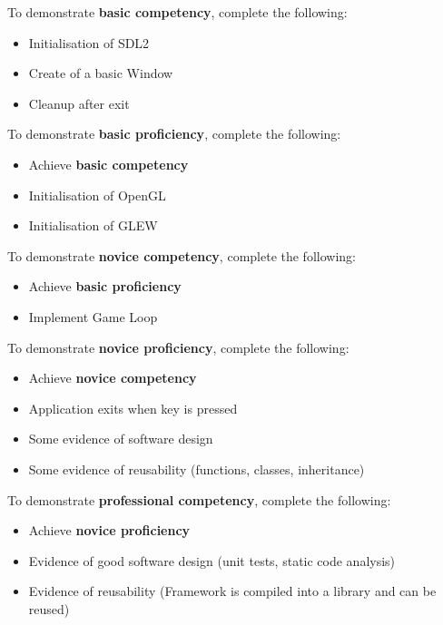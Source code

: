 \documentclass{../../../fal_assignment}
\begin{document}
To demonstrate \textbf{basic competency}, complete the following:
\begin{itemize}
	\item Initialisation of SDL2
	\item Create of a basic Window
	\item Cleanup after exit
\end{itemize} 

To demonstrate \textbf{basic proficiency}, complete the following:
\begin{itemize}
	\item Achieve \textbf{basic competency}
	\item Initialisation of OpenGL
	\item Initialisation of GLEW
\end{itemize}

To demonstrate \textbf{novice competency}, complete the following:
\begin{itemize}
	\item Achieve \textbf{basic proficiency}
	\item Implement Game Loop
\end{itemize}

To demonstrate \textbf{novice proficiency}, complete the following:
\begin{itemize}
	\item Achieve \textbf{novice competency}
	\item Application exits when key is pressed
	\item Some evidence of software design
	\item Some evidence of reusability (functions, classes, inheritance) 
\end{itemize}

To demonstrate \textbf{professional competency}, complete the following:
\begin{itemize}
	\item Achieve \textbf{novice proficiency}
	\item Evidence of good software design (unit tests, static code analysis)
	\item Evidence of reusability (Framework is compiled into a library and can be reused)
\end{itemize}
\end{document}
